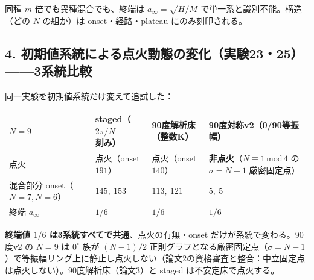 \documentclass[
  a4paper,
]{ltjsarticle}
\newcounter{none} %
\begin{document}
同種 \(m\) 倍でも異種混合でも、終端は \(a_\infty=\sqrt{H/M}\)
で単一系と識別不能。構造（どの \(N\) の組か）は onset・経路・plateau
にのみ刻印される。

\subsection{4.
初期値系統による点火動態の変化（実験23・25）------3系統比較}\label{ux521dux671fux5024ux7cfbux7d71ux306bux3088ux308bux70b9ux706bux52d5ux614bux306eux5909ux5316ux5b9fux9a1323253ux7cfbux7d71ux6bd4ux8f03}

同一実験を初期値系統だけ変えて追試した：

{\def\LTcaptype{none} %
\begin{longtable}[]{@{}
  >{\raggedright\arraybackslash}p{}
  >{\raggedright\arraybackslash}p{}
  >{\raggedright\arraybackslash}p{}
  >{\raggedright\arraybackslash}p{}@{}}
\toprule\noalign{}
\begin{minipage}[b]{\linewidth}\raggedright
\(N=9\)
\end{minipage} & \begin{minipage}[b]{\linewidth}\raggedright
staged（\(2\pi/N\) 刻み）
\end{minipage} & \begin{minipage}[b]{\linewidth}\raggedright
90度解析床（整数K）
\end{minipage} & \begin{minipage}[b]{\linewidth}\raggedright
90度対称v2（0/90等振幅）
\end{minipage} \\
\midrule\noalign{}
\endhead
\bottomrule\noalign{}
\endlastfoot
点火 & 点火（onset \(191\)） & 点火（onset \(140\)） &
\textbf{非点火}（\(N\equiv1\,\mathrm{mod}\,4\) の \(\sigma=N-1\)
厳密固定点） \\
混合部分 onset（\(N=7,N=6\)） & \(145,\ 153\) & \(113,\ 121\) &
\(5,\ 5\) \\
終端 \(a_\infty\) & \(1/6\) & \(1/6\) & \(1/6\) \\
\end{longtable}
}

\textbf{終端値 \(1/6\) は3系統すべてで共通}、点火の有無・onset
だけが系統で変わる。90度v2 の \(N=9\) は \(0^\circ\) 族が \((N-1)/2\)
正則グラフとなる厳密固定点（\(\sigma=N-1\)）で等振幅リング上に静止し点火しない（論文2の資格審査と整合：中立固定点は点火しない）。90度解析床（論文3）と
staged は不安定床で点火する。
\end{document}
